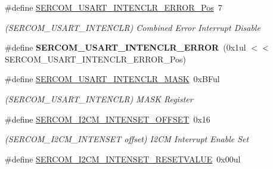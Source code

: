\begin{DoxyCompactItemize}
\item 
\hypertarget{group___s_a_m_l21___s_e_r_c_o_m_ga15a234b6064382e6ba84366e5b2d2871}{}\#define \hyperlink{group___s_a_m_l21___s_e_r_c_o_m_ga15a234b6064382e6ba84366e5b2d2871}{S\+E\+R\+C\+O\+M\+\_\+\+U\+S\+A\+R\+T\+\_\+\+I\+N\+T\+E\+N\+C\+L\+R\+\_\+\+E\+R\+R\+O\+R\+\_\+\+Pos}~7\label{group___s_a_m_l21___s_e_r_c_o_m_ga15a234b6064382e6ba84366e5b2d2871}

\begin{DoxyCompactList}\small\item\em (S\+E\+R\+C\+O\+M\+\_\+\+U\+S\+A\+R\+T\+\_\+\+I\+N\+T\+E\+N\+C\+L\+R) Combined Error Interrupt Disable \end{DoxyCompactList}\item 
\hypertarget{group___s_a_m_l21___s_e_r_c_o_m_ga7f79bad56ebf5daebff4c524a86e1028}{}\#define {\bfseries S\+E\+R\+C\+O\+M\+\_\+\+U\+S\+A\+R\+T\+\_\+\+I\+N\+T\+E\+N\+C\+L\+R\+\_\+\+E\+R\+R\+O\+R}~(0x1ul $<$$<$ S\+E\+R\+C\+O\+M\+\_\+\+U\+S\+A\+R\+T\+\_\+\+I\+N\+T\+E\+N\+C\+L\+R\+\_\+\+E\+R\+R\+O\+R\+\_\+\+Pos)\label{group___s_a_m_l21___s_e_r_c_o_m_ga7f79bad56ebf5daebff4c524a86e1028}

\item 
\hypertarget{group___s_a_m_l21___s_e_r_c_o_m_ga63015e2e66548f313b63e0993eb0febe}{}\#define \hyperlink{group___s_a_m_l21___s_e_r_c_o_m_ga63015e2e66548f313b63e0993eb0febe}{S\+E\+R\+C\+O\+M\+\_\+\+U\+S\+A\+R\+T\+\_\+\+I\+N\+T\+E\+N\+C\+L\+R\+\_\+\+M\+A\+S\+K}~0x\+B\+Ful\label{group___s_a_m_l21___s_e_r_c_o_m_ga63015e2e66548f313b63e0993eb0febe}

\begin{DoxyCompactList}\small\item\em (S\+E\+R\+C\+O\+M\+\_\+\+U\+S\+A\+R\+T\+\_\+\+I\+N\+T\+E\+N\+C\+L\+R) M\+A\+S\+K Register \end{DoxyCompactList}\item 
\hypertarget{group___s_a_m_l21___s_e_r_c_o_m_ga93939093148bb64392ca303dc4873d29}{}\#define \hyperlink{group___s_a_m_l21___s_e_r_c_o_m_ga93939093148bb64392ca303dc4873d29}{S\+E\+R\+C\+O\+M\+\_\+\+I2\+C\+M\+\_\+\+I\+N\+T\+E\+N\+S\+E\+T\+\_\+\+O\+F\+F\+S\+E\+T}~0x16\label{group___s_a_m_l21___s_e_r_c_o_m_ga93939093148bb64392ca303dc4873d29}

\begin{DoxyCompactList}\small\item\em (S\+E\+R\+C\+O\+M\+\_\+\+I2\+C\+M\+\_\+\+I\+N\+T\+E\+N\+S\+E\+T offset) I2\+C\+M Interrupt Enable Set \end{DoxyCompactList}\item 
\hypertarget{group___s_a_m_l21___s_e_r_c_o_m_ga284b0b1ad9c1f9dbf74ccb452d9f8279}{}\#define \hyperlink{group___s_a_m_l21___s_e_r_c_o_m_ga284b0b1ad9c1f9dbf74ccb452d9f8279}{S\+E\+R\+C\+O\+M\+\_\+\+I2\+C\+M\+\_\+\+I\+N\+T\+E\+N\+S\+E\+T\+\_\+\+R\+E\+S\+E\+T\+V\+A\+L\+U\+E}~0x00ul\label{group___s_a_m_l21___s_e_r_c_o_m_ga284b0b1ad9c1f9dbf74ccb452d9f8279}


\end{DoxyCompactItemize}
